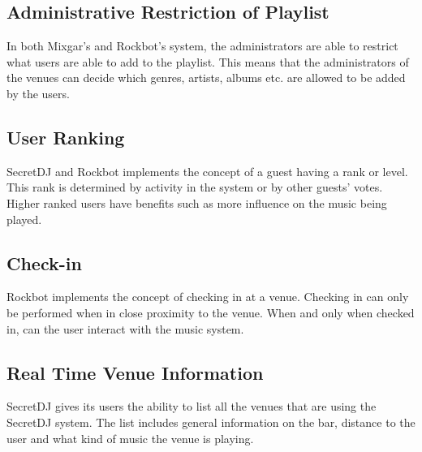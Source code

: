\subsection{Administrative Restriction of Playlist}
In both Mixgar's and Rockbot's system, the administrators are able to
restrict what users are able to add to the playlist. This means that
the administrators of the venues can decide which genres, artists,
albums etc. are allowed to be added by the users.

\subsection{User Ranking}
SecretDJ and Rockbot implements the concept of a guest having a rank or
level. This rank is determined by activity in the system or by other
guests' votes. Higher ranked users have benefits such as more influence on the music being played.

\subsection{Check-in}
Rockbot implements the concept of checking in at a venue. Checking in
can only be performed when in close proximity to the venue. When and
only when checked in, can the user interact with the music system.

\subsection{Real Time Venue Information}
SecretDJ gives its users the ability to list all the venues that are
using the SecretDJ system. The list includes general information on
the bar, distance to the user and what kind of music the venue is
playing.
